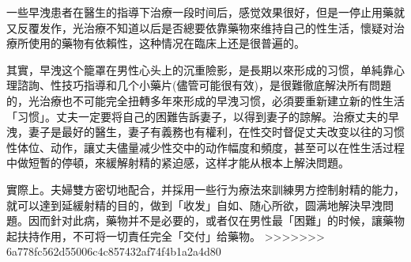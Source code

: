 \documentclass[12pt,UTF8]{ctexbook}
\begin{document}
一些早洩患者在醫生的指導下治療一段时间后，感觉效果很好，但是一停止用藥就又反覆发作，光治療不知道以后是否總要依靠藥物來维持自己的性生活，懷疑对治療所使用的藥物有依賴性，这种情况在臨床上还是很普遍的。

其實，早洩这个籠罩在男性心头上的沉重險影，是長期以來形成的习惯，单純靠心理諮詢、性技巧指導和几个小藥片(儘管可能很有效)，是很難徹底解決所有問題的，光治療也不可能完全扭轉多年來形成的早洩习惯，必須要重新建立新的性生活「习惯」。丈夫一定要将自己的困難告訴妻子，以得到妻子的諒解。治療丈夫的早洩，妻子是最好的醫生，妻子有義務也有權利，在性交时督促丈夫改变以往的习惯性体位、动作，讓丈夫儘量减少性交中的动作幅度和頻度，甚至可以在性生活过程中做短暫的停頓，來緩解射精的紧迫感，这样才能从根本上解決問題。

實際上。夫婦雙方密切地配合，并採用一些行为療法來訓練男方控制射精的能力，就可以達到延緩射精的目的，做到「收发」自如、随心所欲，圆满地解決早洩問題。因而針对此病，藥物并不是必要的，或者仅在男性最「困難」的时候，讓藥物起扶持作用，不可将一切責任完全「交付」给藥物。
>>>>>>> 6a778fc562d55006c4c857432af74f4b1a2a4d80

\backmatter
\end{document}
